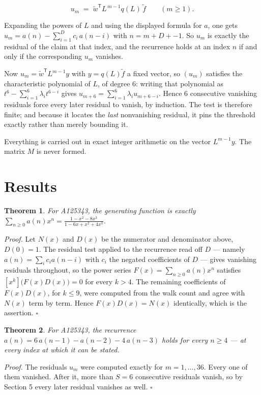 \documentclass[11pt]{article}
\newtheorem{theorem}{Theorem}
\theoremstyle{definition}
\begin{document}
\[u_m \;=\; \tilde w^{\mathsf T} L^{\,m-1} q(L)\,\tilde f \qquad (m \ge 1).\]

Expanding the powers of $L$ and using the displayed formula for $a$, one gets $u_m = a(n) - \sum_{i=1}^{D} c_i\,a(n-i)$ with $n = m + D + -1$. So $u_m$ is exactly the residual of the claim at that index, and the recurrence holds at an index $n$ if and only if the corresponding $u_m$ vanishes.

Now $u_m = \tilde w^{\mathsf T} L^{m-1} y$ with $y = q(L)\tilde f$ a fixed vector, so $(u_m)$ satisfies the characteristic polynomial of $L$, of degree $6$: writing that polynomial as $t^{6} - \sum_{i=1}^{6} \lambda_i t^{6-i}$ gives $u_{m+6} = \sum_{i=1}^{6} \lambda_i u_{m+6-i}$. Hence $6$ consecutive vanishing residuals force every later residual to vanish, by induction. The test is therefore finite; and because it locates the {\itshape last} nonvanishing residual, it pins the threshold exactly rather than merely bounding it.

Everything is carried out in exact integer arithmetic on the vector $L^{m-1}y$. The matrix $M$ is never formed.

\section{Results}

\begin{theorem} For A125343, the generating function is exactly $\sum_{n\ge 0} a(n)x^n = \frac{1 - x^{2} - 8x^{3}}{1 - 6x + x^{2} + 4x^{3}}$.\end{theorem}

{\itshape Proof.} Let $N(x)$ and $D(x)$ be the numerator and denominator above, $D(0)=1$. The residual test applied to the recurrence read off $D$ --- namely $a(n) = \sum_i c_i a(n-i)$ with $c_i$ the negated coefficients of $D$ --- gives vanishing residuals throughout, so the power series $F(x)=\sum_{n\ge 0}a(n)x^n$ satisfies $[x^k]\bigl(F(x)D(x)\bigr) = 0$ for every $k > 4$. The remaining coefficients of $F(x)D(x)$, for $k \le 9$, were computed from the walk count and agree with $N(x)$ term by term. Hence $F(x)D(x) = N(x)$ identically, which is the assertion. $\square$

\begin{theorem} For A125343, the recurrence $a(n) = 6\,a(n-1) - a(n-2) - 4\,a(n-3)$ holds for every $n \ge 4$ --- at every index at which it can be stated.\end{theorem}

{\itshape Proof.} The residuals $u_m$ were computed exactly for $m = 1,\dots,36$. Every one of them vanished. After it, more than $S = 6$ consecutive residuals vanish, so by Section 5 every later residual vanishes as well. $\square$
\end{document}
